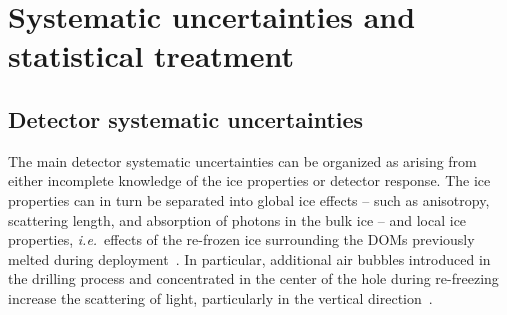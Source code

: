 \section{Systematic uncertainties and statistical treatment\label{sec:systematics}}

\subsection{Detector systematic uncertainties\label{sec:detector_systematics}}

The main detector systematic uncertainties can be organized as arising from either incomplete knowledge of the ice properties or detector response.
The ice properties can in turn be separated into global ice effects -- such as anisotropy, scattering length, and absorption of photons in the bulk ice -- and local ice properties, {\it{}i.e.}\ effects of the re-frozen ice surrounding the DOMs previously melted during deployment~\cite{Karle:1994eua}.
In particular, additional air bubbles introduced in the drilling process and concentrated in the center of the hole during re-freezing increase the scattering of light, particularly in the vertical direction~\cite{Aartsen:2016nxy}.

